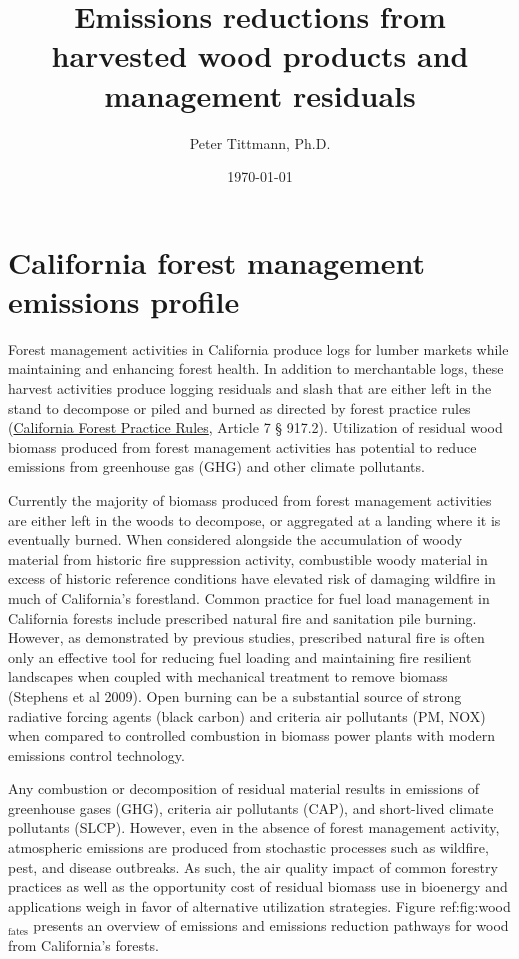 \documentclass[a4paper]{article}
\author{Peter Tittmann, Ph.D.}
\date{\today}
\title{Emissions reductions from harvested wood products and management residuals}
\begin{document}
\maketitle
\tableofcontents

\pagebreak
\section{California forest management emissions profile}
\label{sec-1}

Forest management activities in California produce logs for lumber markets while maintaining and enhancing forest health. In addition to merchantable logs, these harvest activities produce logging residuals and slash that are either left in the stand to decompose or piled and burned as directed by forest practice rules (\href{http://calfire.ca.gov/resource_mgt/downloads/2013_FP_Rulebook_with_Tech_RuleNo1.pdf}{California Forest Practice Rules}, Article 7 §
917.2). Utilization of residual wood biomass produced from forest management activities has potential to reduce emissions from greenhouse gas (GHG) and other climate pollutants.

Currently the majority of biomass produced from forest management activities are either left in the woods to decompose, or aggregated at a landing where it is eventually burned. When considered alongside the accumulation of woody material from historic fire suppression activity, combustible woody material in excess of historic reference conditions have elevated risk of damaging wildfire in much of California’s forestland. Common practice for fuel load management in California forests include prescribed natural fire and sanitation pile burning. However, as demonstrated by previous studies, prescribed natural fire is often only an effective tool for reducing fuel loading and maintaining fire resilient landscapes when coupled with mechanical treatment to remove biomass (Stephens et al 2009). Open burning can be a substantial source of strong radiative forcing agents (black carbon) and criteria air pollutants (PM, NOX) when compared to controlled combustion in biomass power plants with modern emissions control technology. 

Any combustion or decomposition of residual material results in emissions of greenhouse gases (GHG), criteria air pollutants (CAP), and short-lived climate pollutants (SLCP). However, even in the absence of forest management activity, atmospheric emissions are produced from stochastic processes such as wildfire, pest, and disease outbreaks. As such, the air quality impact of common forestry practices as well as the opportunity cost of residual biomass use in bioenergy and applications weigh in favor of alternative utilization strategies. Figure ref:fig:wood$_{\text{fates}}$ presents an overview of emissions and emissions reduction pathways for wood from California's forests. 
\end{document}
